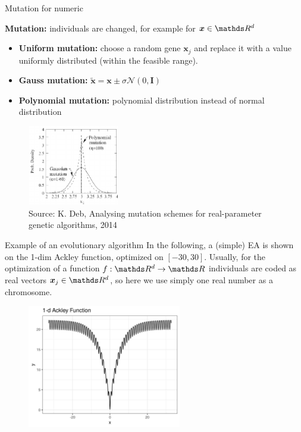 \documentclass[11pt,compress,t,notes=noshow, xcolor=table]{beamer}
\begin{document}
\begin{vbframe}{Mutation for numeric}

\footnotesize
\textbf{Mutation:} individuals are changed, for example for $\bm{x} \in \R^d$
\begin{itemize}
\item \textbf{Uniform mutation:} choose a random gene $\bm{x}_j$ and replace it with a value uniformly distributed (within the feasible range).
\item \textbf{Gauss mutation:} $\bm{\tilde{x}} = \bm{x} \pm \sigma \mathcal{N}(0, \boldsymbol{I})$
\item \textbf{Polynomial mutation:} polynomial distribution instead of normal distribution
\end{itemize}
\begin{center}
\begin{figure}
  \includegraphics[height = 3.5cm, width = 4cm]{figure_man/polynomial_mutation.png}\\
  \scriptsize{Source: K. Deb, Analysing mutation schemes for real-parameter genetic algorithms, 2014}
\end{figure}
\end{center}

\end{vbframe}





\begin{vbframe}{Example of an evolutionary algorithm}
\footnotesize
In the following, a (simple) EA is shown on the 1-dim Ackley function, optimized on $[-30, 30]$. Usually, for the optimization of a function $f:\R^d \to \R$ individuals are coded as real vectors $\bm{x}_j \in \R^d$, so here we use simply one real number as a chromosome.

\begin{center}
\begin{figure}
  \includegraphics[width=0.6\textwidth]{figure_man/1dim-ackley-func.png}
\end{figure}
\end{center}

\end{vbframe}
\end{document}
